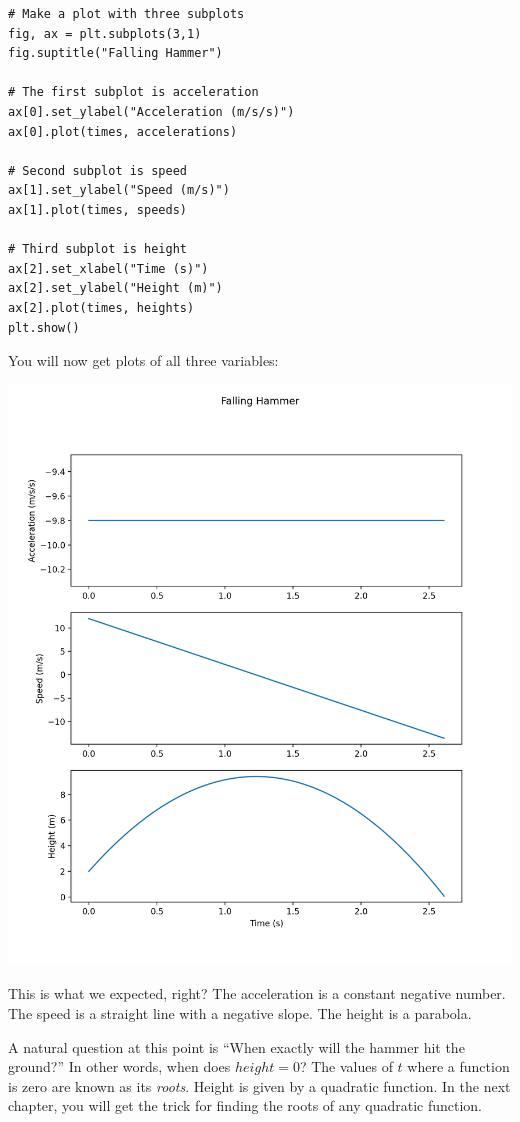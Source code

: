 \begin{Verbatim}
# Make a plot with three subplots
fig, ax = plt.subplots(3,1)
fig.suptitle("Falling Hammer")

# The first subplot is acceleration
ax[0].set_ylabel("Acceleration (m/s/s)")
ax[0].plot(times, accelerations)

# Second subplot is speed
ax[1].set_ylabel("Speed (m/s)")
ax[1].plot(times, speeds)

# Third subplot is height
ax[2].set_xlabel("Time (s)")
ax[2].set_ylabel("Height (m)")
ax[2].plot(times, heights)
plt.show()
\end{Verbatim}

You will now get plots of all three variables:

\includegraphics[width=0.8\linewidth]{stackedplot.png}

This is what we expected, right?  The acceleration is a constant negative number.  The speed is a
straight line with a negative slope.  The height is a parabola.

A natural question at this point is ``When exactly will the hammer hit the
ground?''  In other words, when does $height = 0$? The values of $t$ where a function is zero are
known as its \textit{roots}. Height is given by a quadratic function. In the next
chapter, you will get the trick for finding the roots of any quadratic
function.
